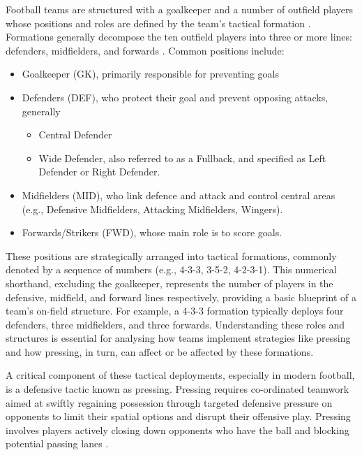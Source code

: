 Football teams are structured with a goalkeeper and a number of outfield players whose positions and roles are defined by the team's tactical formation \citep{ma_analysis_2020, forcher_success_2023}.
Formations generally decompose the ten outfield players into three or more lines: defenders, midfielders, and forwards \citep{ma_analysis_2020, forcher_success_2023}. Common positions include:
\begin{itemize}
    \item Goalkeeper (GK), primarily responsible for preventing goals
    \item Defenders (DEF), who protect their goal and prevent opposing attacks, generally 
    \begin{itemize}
        \item Central Defender 
        \item Wide Defender, also referred to as a Fullback, and specified as Left Defender or Right Defender.
    \end{itemize}
    \item Midfielders (MID), who link defence and attack and control central areas (e.g., Defensive Midfielders, Attacking Midfielders, Wingers).
    \item Forwards/Strikers (FWD), whose main role is to score goals.
\end{itemize}
These positions are strategically arranged into tactical formations, commonly denoted by a sequence of numbers (e.g., 4-3-3, 3-5-2, 4-2-3-1). This numerical shorthand, excluding the goalkeeper, represents the number of players in the defensive, midfield, and forward lines respectively, providing a basic blueprint of a team's on-field structure. For example, a 4-3-3 formation typically deploys four defenders, three midfielders, and three forwards. Understanding these roles and structures is essential for analysing how teams implement strategies like pressing and how pressing, in turn, can affect or be affected by these formations.

\citep{forcher_success_2023, low_defending_2022}

A critical component of these tactical deployments, especially in modern football, is a defensive tactic known as pressing. Pressing requires co-ordinated teamwork aimed at swiftly regaining possession through targeted defensive pressure on opponents to limit their spatial options and disrupt their offensive play. Pressing involves players actively closing down opponents who have the ball and blocking potential passing lanes \citep{borbely_all_2018}.

